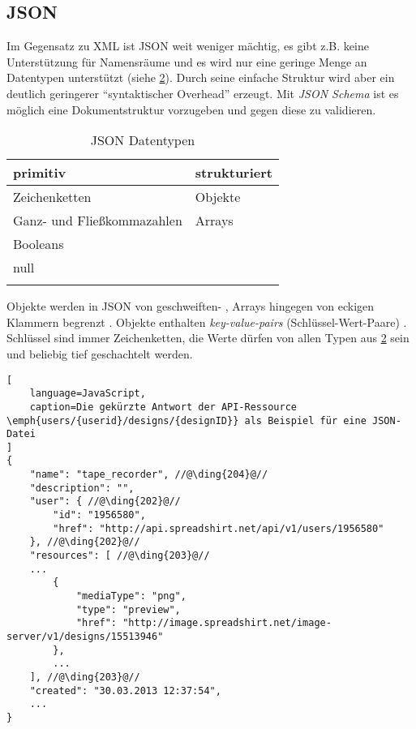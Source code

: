 \subsection{JSON}
\label{sec:json}


Im Gegensatz zu XML ist JSON weit weniger mächtig, es gibt z.B. keine Unterstützung für Namensräume und es wird nur eine geringe Menge an Datentypen unterstützt (siehe \cref{tab:jsonDatatypes}). 
Durch seine einfache Struktur wird aber ein deutlich geringerer \enquote{syntaktischer Overhead} erzeugt.
Mit \emph{JSON Schema} \cite{json-schema-draft} ist es möglich eine Dokumentstruktur vorzugeben und gegen diese zu validieren. 

\begin{table}[tb]
    \begin{longtable}[c]{l l}
        \toprule
        \rowcolor{lightgray}
        \textbf{primitiv}   & \textbf{strukturiert}\\
        \midrule
        Zeichenketten       & Objekte\\
        Ganz- und 
        Fließkommazahlen    & Arrays\\
        Booleans            & \\
        null                & \\
        \bottomrule
        \caption{JSON Datentypen}
        \label{tab:jsonDatatypes}
    \end{longtable}
\end{table}

Objekte werden in JSON von geschweiften- , Arrays hingegen von eckigen Klammern begrenzt . 
Objekte enthalten \emph{key-value-pairs} (Schlüssel-Wert-Paare) . Schlüssel sind immer Zeichenketten, die Werte dürfen von allen Typen aus \cref{tab:jsonDatatypes} sein und beliebig tief geschachtelt werden.
%
%
\begin{lstlisting}[
    language=JavaScript,
    caption=Die gekürzte Antwort der API-Ressource \emph{users/{userid}/designs/{designID}} als Beispiel für eine JSON-Datei
]
{
    "name": "tape_recorder", //@\ding{204}@//
    "description": "",
    "user": { //@\ding{202}@//
        "id": "1956580",
        "href": "http://api.spreadshirt.net/api/v1/users/1956580"
    }, //@\ding{202}@//
    "resources": [ //@\ding{203}@//
    ...
        {
            "mediaType": "png",
            "type": "preview",
            "href": "http://image.spreadshirt.net/image-server/v1/designs/15513946"
        }, 
        ...
    ], //@\ding{203}@//
    "created": "30.03.2013 12:37:54",
    ...
}
\end{lstlisting}    
